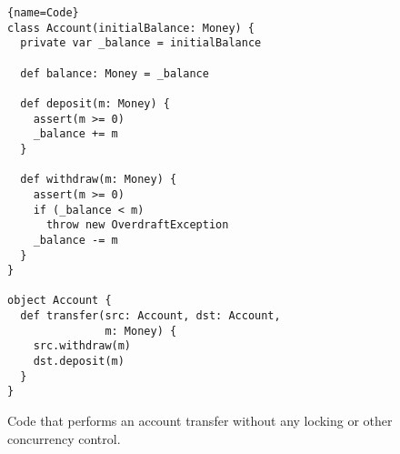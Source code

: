 \begin{figure}
\begin{lstlisting}{name=Code}
class Account(initialBalance: Money) {
  private var _balance = initialBalance

  def balance: Money = _balance

  def deposit(m: Money) {
    assert(m >= 0)
    _balance += m
  }

  def withdraw(m: Money) {
    assert(m >= 0)
    if (_balance < m)
      throw new OverdraftException
    _balance -= m
  }
}

object Account {
  def transfer(src: Account, dst: Account,
               m: Money) {
    src.withdraw(m)
    dst.deposit(m)
  }
}
\end{lstlisting}

\caption{Code that performs an account transfer without
any locking or other concurrency control.}

\label{fig:example:nosync}
\end{figure}
